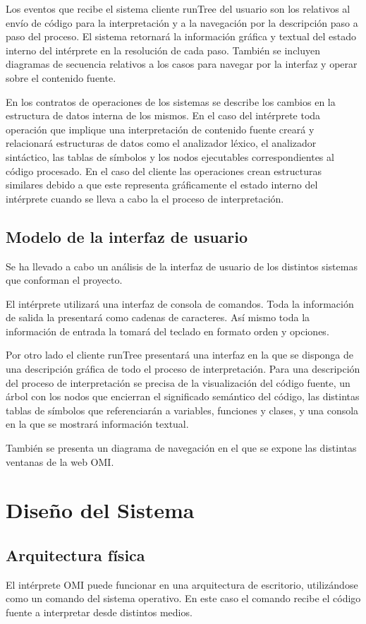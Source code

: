Los eventos que recibe el sistema cliente runTree del usuario son los relativos al envío de código para la interpretación y a la navegación por la descripción paso a paso del proceso.  El sistema retornará la información 
gráfica y textual del estado interno del intérprete en la resolución de cada paso.  También se incluyen diagramas de secuencia relativos a los casos para navegar por la interfaz y operar sobre el contenido fuente.  

En los contratos de operaciones de los sistemas se describe los cambios en la estructura de datos interna de los mismos. En el caso del intérprete toda operación que implique una interpretación de contenido fuente creará 
y relacionará  estructuras de datos como el analizador léxico, el analizador sintáctico, las tablas de símbolos y los nodos ejecutables correspondientes al código procesado. En el caso del cliente las operaciones 
crean estructuras similares debido a que este representa gráficamente el estado interno del intérprete cuando se lleva a cabo la el proceso de interpretación.

\subsection{Modelo de la interfaz de usuario}
Se ha llevado a cabo un análisis de la interfaz de usuario de los distintos sistemas que conforman el proyecto.

El intérprete utilizará una interfaz de consola de comandos. Toda la información de salida la presentará como 
cadenas de caracteres. Así mismo toda la información de entrada la tomará del teclado en formato orden y opciones. 

Por otro lado el cliente runTree presentará una interfaz en la que se disponga de una descripción gráfica de todo el proceso 
de interpretación. Para una descripción del proceso de interpretación se precisa de la visualización del código fuente, un árbol con los nodos
que encierran el significado semántico del código, las distintas tablas de símbolos que referenciarán a variables, funciones y clases, y una consola
en la que se mostrará información textual.

También se presenta un diagrama de navegación en el que se expone las distintas ventanas de la web OMI.

\section{Diseño del Sistema}
\subsection {Arquitectura física}
El intérprete OMI puede funcionar en una arquitectura de escritorio, utilizándose como un comando del sistema operativo. En este caso el comando recibe el código 
fuente a interpretar desde distintos medios. 

